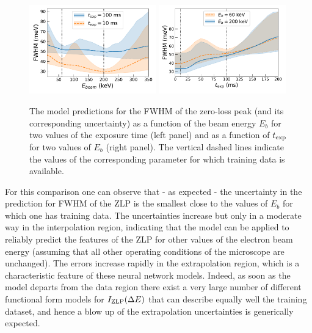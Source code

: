 \begin{figure}[H]
    \centering
    \includegraphics[width=0.49\textwidth]{plots/Ebeam_extrapolation.pdf}
    \includegraphics[width=0.49\textwidth]{plots/time_extrapolation.pdf}
    \caption{The model predictions for the FWHM of the zero-loss peak
      (and its corresponding uncertainty) as a function of the beam energy $E_b$
      for two values of the exposure time (left panel)
      and as a function of $t_{\rm exp}$ for two values of $E_b$ (right panel).
      The vertical dashed lines indicate the values of the
      corresponding parameter for which training data is available.
    }
\label{fig:extrapolbeam}
\end{figure}

For this comparison one can observe that - as expected - the uncertainty in the  prediction for FWHM
of the ZLP is the smallest close to the values of $E_b$ for which one has training data.
%
The uncertainties increase but only in a moderate way in the interpolation region, indicating that
the model can be applied to reliably predict the features of the ZLP for other values of the electron
beam energy (assuming that all other operating conditions of the microscope are unchanged).
%
The errors increase rapidly in the extrapolation region, which is a characteristic feature of
these neural network models.
%
Indeed, as soon as the model departs from the data region there exist a very large
number of different functional form models for $I_{\rm ZLP}(\Delta E)$ that can describe equally well
the training dataset, and hence a blow up of the extrapolation uncertainties is generically expected.

